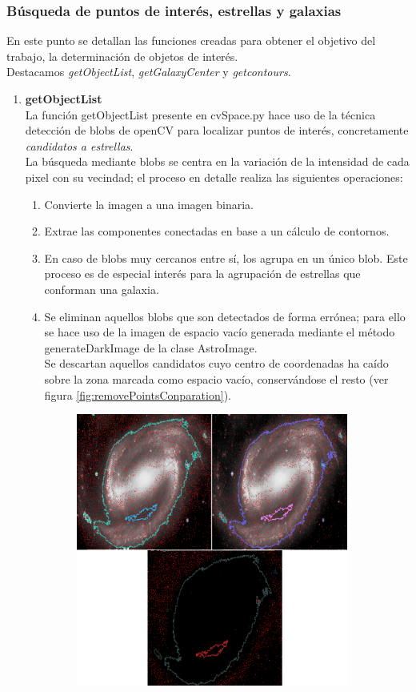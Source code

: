 	\subsubsection{Búsqueda de puntos de interés, estrellas y galaxias}
	En este punto se detallan las funciones creadas para obtener el objetivo del trabajo, la determinación de objetos de interés.\\
	Destacamos \emph{getObjectList}, \emph{getGalaxyCenter} y \emph{getcontours}.\\
	\begin{enumerate}
	\item \textbf{getObjectList}\\
	La función getObjectList presente en cvSpace.py hace uso de la técnica detección de blobs de openCV para localizar puntos de interés, concretamente \emph{candidatos a estrellas}.\\
	La búsqueda mediante blobs se centra en la variación de la intensidad de cada pixel con su vecindad; el proceso en detalle realiza las siguientes operaciones:
	\begin{enumerate}
		\item Convierte la imagen a una imagen binaria.
		\item Extrae las componentes conectadas en base a un cálculo de contornos.
		\item En caso de blobs muy cercanos entre sí, los agrupa en un único blob. Este proceso  es de especial interés para la agrupación de estrellas que conforman una galaxia.
		\item Se eliminan aquellos blobs que son detectados de forma errónea; para ello se hace uso de la imagen de espacio vacío generada mediante el método {\scriptsize generateDarkImage} de la clase AstroImage.\\
		Se descartan aquellos candidatos cuyo centro de coordenadas ha caído sobre la zona marcada como espacio vacío, conservándose el resto (ver figura \ref{fig:removePointsConparation}).
		\begin{figure}[!htb]
			\centering
			\includegraphics[width=0.9\textwidth]{images/removeBadPoints3.png}

\end{figure}
\end{enumerate}
\end{enumerate}
